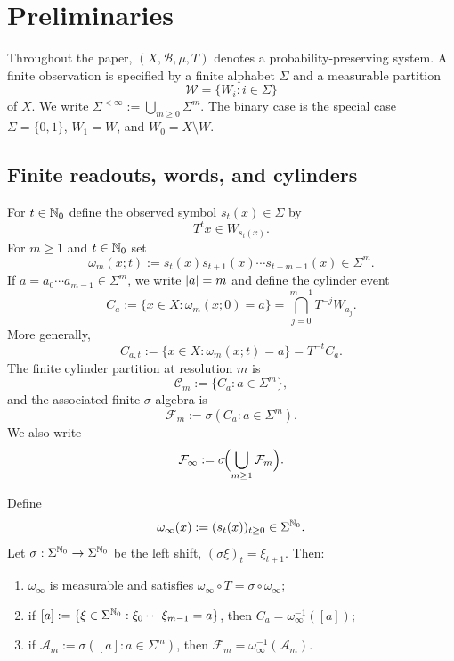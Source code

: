 \section{Preliminaries}\label{sec:preliminaries}

Throughout the paper, \((X,\mathcal{B},\mu,T)\) denotes a
probability-preserving system.  A finite observation is specified by a
finite alphabet \(\Sigma\) and a measurable partition
\[
  \mathcal W=\{W_i:i\in\Sigma\}
\]
of \(X\).  We write
\(\Sigma^{<\infty}:=\bigcup_{m\ge 0}\Sigma^m\).  The binary case is the
special case \(\Sigma=\{0,1\}\), \(W_1=W\), and
\(W_0=X\setminus W\).

\subsection{Finite readouts, words, and cylinders}

For \(t\in\mathbb{N}_0\) define the observed symbol \(s_t(x)\in\Sigma\) by
\[
  T^t x\in W_{s_t(x)} .
\]
For $m\ge 1$ and $t\in\mathbb{N}_0$ set
\[
  \omega_m(x;t):=s_t(x)s_{t+1}(x)\cdots s_{t+m-1}(x)\in\Sigma^m.
\]
If $a=a_0\cdots a_{m-1}\in\Sigma^m$, we write $\lvert a\rvert=m$ and define the
cylinder event
\[
  C_a:=\{x\in X:\omega_m(x;0)=a\}
  =\bigcap_{j=0}^{m-1}T^{-j}W_{a_j}.
\]
More generally,
\[
  C_{a,t}:=\{x\in X:\omega_m(x;t)=a\}=T^{-t}C_a.
\]
The finite cylinder partition at resolution $m$ is
\[
  \mathcal{C}_m:=\{C_a:a\in\Sigma^m\},
\]
and the associated finite $\sigma$-algebra is
\[
  \mathcal{F}_m:=\sigma(C_a:a\in\Sigma^m).
\]
We also write
\[
  \mathcal{F}_\infty:=\sigma\!\Bigl(\bigcup_{m\ge 1}\mathcal{F}_m\Bigr).
\]

\begin{proposition}\label{prop:symbolic-factor}
Define
\[
  \omega_\infty(x):=(s_t(x))_{t\ge 0}\in\Sigma^{\mathbb{N}_0}.
\]
Let $\sigma:\Sigma^{\mathbb{N}_0}\to\Sigma^{\mathbb{N}_0}$ be the left shift,
$(\sigma\xi)_t=\xi_{t+1}$. Then:
\begin{enumerate}[label=(\alph*)]
  \item $\omega_\infty$ is measurable and satisfies
  $\omega_\infty\circ T=\sigma\circ\omega_\infty$;
  \item if $[a]:=\{\xi\in\Sigma^{\mathbb{N}_0}:\xi_0\cdots\xi_{m-1}=a\}$,
  then $C_a=\omega_\infty^{-1}([a])$;
  \item if $\mathcal{A}_m:=\sigma([a]:a\in\Sigma^m)$, then
  $\mathcal{F}_m=\omega_\infty^{-1}(\mathcal{A}_m)$.
\end{enumerate}
\end{proposition}

